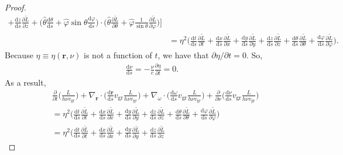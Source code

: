 \documentclass[10pt]{article}
\newcommand{\dee}{\mathrm{d}}
\newcommand{\ve}[1]{\mathbf{#1}}
\newcommand{\group}{\mathrm{gr}}
\begin{document}
\begin{itemize}
\begin{proof}
\begin{align*}
        + \frac{\dee z}{\dee s} \frac{\partial \tilde L}{\partial z}
        + \bigg( \hat \theta \frac{\dee \theta}{\dee s} + \hat\varphi \sin \theta \frac{\dee \varphi}{\dee s} \bigg) \cdot \bigg( \hat\theta \frac{\partial \tilde L}{\partial \theta} + \hat\varphi \frac{1}{\sin\theta} \frac{\partial \tilde L}{\partial \varphi} \bigg) 
        \bigg] \\
        &= \eta^2 \bigg(
        \frac{\dee t}{\dee s} \frac{\partial \tilde L}{\partial t} 
        + \frac{\dee x}{\dee s} \frac{\partial \tilde L}{\partial x}
        + \frac{\dee y}{\dee s} \frac{\partial \tilde L}{\partial y}
        + \frac{\dee z}{\dee s} \frac{\partial \tilde L}{\partial z}
        + \frac{\dee \theta}{\dee s} \frac{\partial \tilde L}{\partial \theta}
        + \frac{\dee \varphi}{\dee s} \frac{\partial \tilde L}{\partial \varphi}        
        \bigg).
      \end{align*}      
      Because $\eta \equiv \eta(\ve{r}, \nu)$ is not a function of $t$, we have that $\partial \eta / \partial t = 0$. So,
      \begin{align*}
        \frac{\dee \nu}{\dee s} = -\frac{\nu}{c} \frac{\partial \eta}{\partial t} = 0.
      \end{align*}
      As a result,
      \begin{align*}
        & \frac{\partial}{\partial t}\bigg(\frac{L}{h \nu v_\group}\bigg)
        + \nabla_{\ve{r}} \cdot \bigg( \frac{\dee \ve{r}}{\dee s} v_\group \frac{L}{h \nu v_\group} \bigg)
        + \nabla_{\omega} \cdot \bigg( \frac{\dee \omega}{\dee s} v_\group \frac{L}{h \nu v_\group} \bigg)
        + \frac{\partial}{\partial \nu} \bigg( \frac{\dee \nu}{\dee s} v_\group \frac{L}{h \nu v_\group} \bigg)\\
        &= \eta^2 \bigg(
        \frac{\dee t}{\dee s} \frac{\partial \tilde L}{\partial t} 
        + \frac{\dee x}{\dee s} \frac{\partial \tilde L}{\partial x}
        + \frac{\dee y}{\dee s} \frac{\partial \tilde L}{\partial y}
        + \frac{\dee z}{\dee s} \frac{\partial \tilde L}{\partial z}
        + \frac{\dee \theta}{\dee s} \frac{\partial \tilde L}{\partial \theta}
        + \frac{\dee \varphi}{\dee s} \frac{\partial \tilde L}{\partial \varphi}        
        \bigg) \\
        &= \eta^2 \bigg(
        \frac{\dee t}{\dee s} \frac{\partial \tilde L}{\partial t} 
        + \frac{\dee x}{\dee s} \frac{\partial \tilde L}{\partial x}
        + \frac{\dee y}{\dee s} \frac{\partial \tilde L}{\partial y}
        + \frac{\dee z}{\dee s} \frac{\partial \tilde L}{\partial z}

\end{align*}
\end{proof}
\end{itemize}
\end{document}
